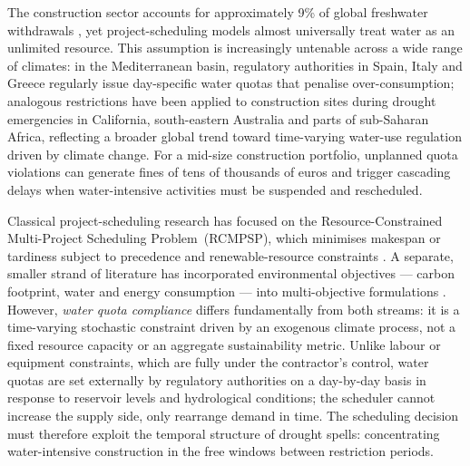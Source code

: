 \documentclass[12pt,a4paper]{article}
\begin{document}
The construction sector accounts for approximately 9\% of global freshwater
withdrawals \citep{UN2021}, yet project-scheduling models almost universally treat
water as an unlimited resource.  This assumption is increasingly untenable across
a wide range of climates: in the Mediterranean basin, regulatory authorities in
Spain, Italy and Greece regularly issue day-specific water quotas that penalise
over-consumption; analogous restrictions have been applied to construction sites
during drought emergencies in California, south-eastern Australia and parts of
sub-Saharan Africa, reflecting a broader global trend toward time-varying
water-use regulation driven by climate change.  For a mid-size construction
portfolio, unplanned quota violations can generate fines of tens of thousands of
euros and trigger cascading delays when water-intensive activities must be
suspended and rescheduled.

Classical project-scheduling research has focused on the Resource-Constrained
Multi-Project Scheduling Problem~(RCMPSP), which minimises makespan or tardiness
subject to precedence and renewable-resource constraints
\citep{Artigues2026,Hartmann2022}.  A separate, smaller strand of literature has
incorporated environmental objectives — carbon footprint, water and energy consumption
— into multi-objective formulations \citep{Barrientos2016}.  However, \emph{water
quota compliance} differs fundamentally from both streams: it is a time-varying
stochastic constraint driven by an exogenous climate process, not a fixed resource
capacity or an aggregate sustainability metric.  Unlike labour or equipment
constraints, which are fully under the contractor's control, water quotas are set
externally by regulatory authorities on a day-by-day basis in response to reservoir
levels and hydrological conditions; the scheduler cannot increase the supply side,
only rearrange demand in time.  The scheduling decision must therefore exploit
the temporal structure of drought spells: concentrating water-intensive construction
in the free windows between restriction periods.
\end{document}
